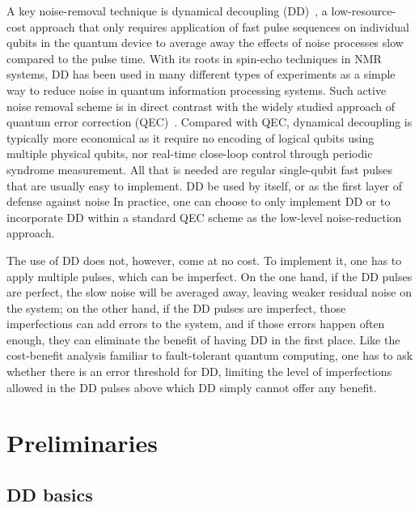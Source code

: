 \documentclass[pra,reprint,superscriptaddress]{revtex4-2}
\begin{document}
A key noise-removal technique is dynamical decoupling (DD)~\cite{viola1999dynamical,duan1998pulse,zanardi1999symmetrizing,khodjasteh2005fault,khodjasteh2007performance,viola2006randomized,uhrig2007keeping,pasini2010optimized,wang2011protection,ng2011combining,kuo2011quadratic}, a low-resource-cost approach that only requires application of fast pulse sequences on individual qubits in the quantum device to average away the effects of noise processes slow compared to the pulse time. With its roots in spin-echo techniques in NMR systems, DD has been used in many different types of experiments as a simple way to reduce noise in quantum information processing systems. Such active noise removal scheme is in direct contrast with the widely studied approach of quantum error correction (QEC)~\cite{Lida2013book}.
Compared with QEC,  dynamical decoupling is typically more economical as it
require no encoding of logical qubits using multiple physical qubits, nor real-time close-loop control through periodic syndrome measurement. All that is needed are regular single-qubit fast pulses that are usually easy to implement. DD be used by itself, or as the first layer of defense against noise In practice, one can choose to only implement DD or to incorporate DD within a standard QEC scheme as the low-level noise-reduction approach. 

The use of DD does not, however, come at no cost. To implement it, one has to apply multiple pulses, which can be imperfect. On the one hand, if the DD pulses are perfect, the slow noise will be averaged away, leaving weaker residual noise on the system; on the other hand, if the DD pulses are imperfect, those imperfections can add errors to the system, and if those errors happen often enough, they can eliminate the benefit of having DD in the first place. Like the cost-benefit analysis familiar to fault-tolerant quantum computing, one has to ask whether there is an error threshold for DD, limiting the level of imperfections allowed in the DD pulses above which DD simply cannot offer any benefit. 

\bigskip
\noindent{}



\newpage

\section{Preliminaries}
\subsection{DD basics}
\end{document}
